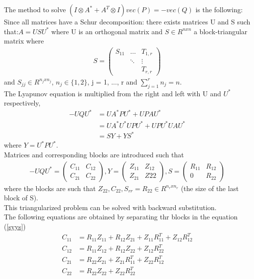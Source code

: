 \documentclass[11pt]{article}
\begin{document}
The method to solve $(I \otimes A^{*} + A^{T} \otimes I) vec(P) = - vec(Q)$ is the following:\\
Since all matrices have a Schur decomposition: there exists matrices U and S such that:$A = U S U^{*}$ where U is an orthogonal matrix and $S \in R^{nxn}$ a block-triangular matrix where
\begin{align}
S = \begin{pmatrix} S_{11}  & \hdots & T_{1,r} \\  & \ddots & \vdots \\ & & T_{r,r}
\end{pmatrix}
\end{align} \label{matrix_S}
and $S_{jj} \in R^{n_{j}xn_{j}}$, $n_{j} \in \{1, 2\}$, j = 1, ..., r and $\sum_{j=1}^{r} n_{j} = n$. \\
The Lyapunov equation is multiplied from the right and left with U and $U^{*}$ respectively,
\begin{align}
- U Q U^{*} &= U A^{*} P U^{*} + U P A U^{*} \\
&= U A^{*} U^{*} U P U^{*} + U P U^{*} U A U^{*} \\
&= S Y + Y S^{*} \label{syys}
\end{align}
where $Y = U^{*} P U^{*}$. \\
Matrices and corresponding blocks are introduced such that
\begin{align}
    - U Q U^{*} = \begin{pmatrix} C_{11} & C_{12} \\ C_{21} & C_{22} \end{pmatrix}, Y = \begin{pmatrix} Z_{11} & Z_{12} \\ Z_{21} & Z{22} \end{pmatrix}, S = \begin{pmatrix} R_{11} & R_{12} \\ 0 & R_{22} \end{pmatrix}
\end{align}
where the blocks are such that $Z_{22}, C_{22}, S_{rr} = R_{22} \in R^{n_{r}xn_{r}}$ (the size of the last block of S). \\
This triangularized problem can be solved with backward substitution. \\
The following equations are obtained by separating thr blocks in the equation (\ref{syys})
\begin{align}
    C_{11} &= R_{11} Z_{11} + R_{12} Z_{21} + Z_{11} R_{11}^{T} + Z_{12} R_{12}^{T} \label{C11} \\
    C_{12} &= R_{11} Z_{12} + R_{12} Z_{22} + Z_{12} R_{22}^{T} \\
    C_{21} &= R_{22} Z_{21} + Z_{21} R_{11}^{T} + Z_{22} R_{12}^{T} \\
    C_{22} &= R_{22} Z_{22} + Z_{22} R_{22}^{T} \label{C22}
\end{align}
\end{document}
